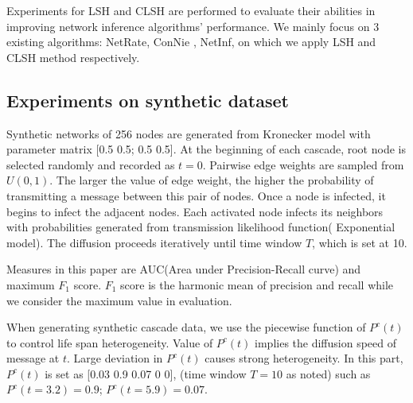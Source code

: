 \quad Experiments for LSH and CLSH are performed to evaluate their abilities in improving network inference algorithms' performance. We mainly focus on 3 existing algorithms: NetRate, ConNie , NetInf, on which we apply LSH and CLSH method respectively. 
\subsection{Experiments on synthetic dataset}

\quad Synthetic networks of 256 nodes are generated from Kronecker model with parameter matrix [0.5 0.5; 0.5 0.5]. At the beginning of each cascade, root node is selected randomly and recorded as $t=0$. Pairwise edge weights are sampled from $U(0,1)$. The larger the value of edge weight, the higher the probability of transmitting a message between this pair of nodes.  Once a node is infected, it begins to infect the adjacent nodes. Each activated node infects its neighbors with probabilities generated from transmission likelihood function( Exponential model). The diffusion proceeds iteratively until time window $T$, which is set at 10.

Measures in this paper are AUC(Area under Precision-Recall curve) and maximum $F_1$ score. $F_1$ score is the harmonic mean of precision and recall while we consider the maximum value in evaluation.

When generating synthetic cascade data, we use the piecewise function of $P^c(t)$ to control life span heterogeneity. Value of $P^c(t)$ implies the diffusion speed of message at $t$. Large deviation in $P^c(t)$ causes strong heterogeneity. In this part, $P^c(t)$ is set as [0.03 0.9 0.07 0 0], (time window $T=10$ as noted) such as $P^c(t=3.2)=0.9$; $P^c(t=5.9)=0.07$.

